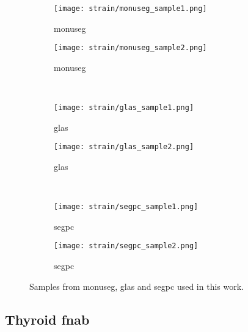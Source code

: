 \begin{figure}
  \centering
  \begin{subfigure}{0.48\textwidth}
    \centering
    \texttt{[image: strain/monuseg\_sample1.png]}
    \caption{\acrshort{monuseg}}
    \label{sfig:strain:monuseg_sample1}
  \end{subfigure}
  \begin{subfigure}{0.48\textwidth}
    \centering
    \texttt{[image: strain/monuseg\_sample2.png]}
    \caption{\acrshort{monuseg}}
    \label{sfig:strain:monuseg_sample2}
  \end{subfigure} \\

  \begin{subfigure}{0.48\textwidth}
    \centering
    \texttt{[image: strain/glas\_sample1.png]}
    \caption{\acrshort{glas}}
    \label{sfig:strain:glas_sample1}
  \end{subfigure}
  \begin{subfigure}{0.48\textwidth}
    \centering
    \texttt{[image: strain/glas\_sample2.png]}
    \caption{\acrshort{glas}}
    \label{sfig:strain:glas_sample2}
  \end{subfigure} \\

  \begin{subfigure}{0.48\textwidth}
    \centering
    \texttt{[image: strain/segpc\_sample1.png]}
    \caption{\acrshort{segpc}}
    \label{sfig:strain:segpc_sample1}
  \end{subfigure}
  \begin{subfigure}{0.48\textwidth}
    \centering
    \texttt{[image: strain/segpc\_sample2.png]}
    \caption{\acrshort{segpc}}
    \label{sfig:strain:segpc_sample2}
  \end{subfigure} 
  
  \caption{Samples from \acrshort{monuseg}, \acrshort{glas} and \acrshort{segpc} used in this work.}
  \label{fig:strain:datasets_samples}
\end{figure}

\subsection{Thyroid \acrshort{fnab}}
\label{ssec:strain:thyroidfnab}

